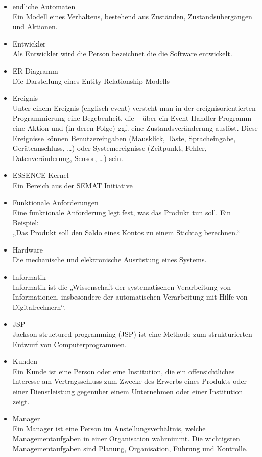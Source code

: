 \begin{itemize}
\item 	endliche Automaten\\
Ein Modell eines Verhaltens, bestehend aus Zuständen, Zustandsübergängen und Aktionen.
\item 	Entwickler\\
Als Entwickler wird die Person bezeichnet die die Software entwickelt.
\item 	ER-Diagramm\\
Die Darstellung eines Entity-Relationship-Modells
\item 	Ereignis\\Unter einem Ereignis (englisch event) versteht man in der ereignisorientierten Programmierung eine Begebenheit, die – über ein Event-Handler-Programm – eine Aktion und (in deren Folge) ggf. eine Zustandsveränderung auslöst. Diese Ereignisse können Benutzereingaben (Mausklick, Taste, Spracheingabe, Geräteanschluss, …) oder Systemereignisse (Zeitpunkt, Fehler, Datenveränderung, Sensor, …) sein.
\item 	ESSENCE Kernel\\
Ein Bereich aus der SEMAT Initiative
\item 	Funktionale Anforderungen\\
Eine funktionale Anforderung legt fest, was das Produkt tun soll. Ein Beispiel:
\\
„Das Produkt soll den Saldo eines Kontos zu einem Stichtag berechnen.“
\item 	Hardware\\
Die mechanische und elektronische Ausrüstung eines Systems.
\item 	Informatik\\Informatik ist die „Wissenschaft der systematischen Verarbeitung von Informationen, insbesondere der automatischen Verarbeitung mit Hilfe von Digitalrechnern“.
\item 	JSP\\Jackson structured programming (JSP) ist eine Methode zum strukturierten Entwurf von Computerprogrammen.
\item 	Kunden\\Ein Kunde ist eine Person oder eine Institution, die ein offensichtliches Interesse am Vertragsschluss zum Zwecke des Erwerbs eines Produkts oder einer Dienstleistung gegenüber einem Unternehmen oder einer Institution zeigt.
\item 	Manager\\
Ein Manager ist eine Person im Anstellungsverhältnis, welche Managementaufgaben in einer Organisation wahrnimmt. Die wichtigsten Managementaufgaben sind Planung, Organisation, Führung und Kontrolle.

\end{itemize}
